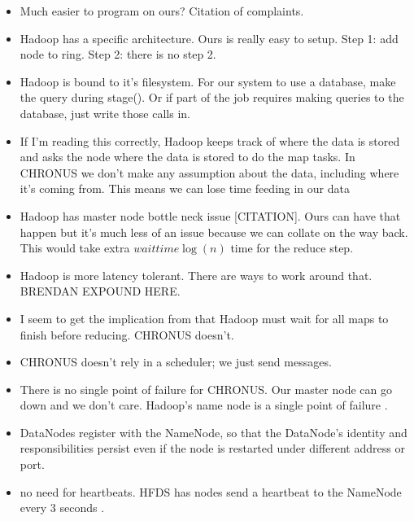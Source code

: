 \documentclass[conference, compsocconf, letterpaper]{IEEEtran}
\begin{document}
\begin{itemize}
    \item Much easier to program on ours? Citation of complaints.

    \item Hadoop has a specific architecture.  Ours is really easy to setup.  Step 1: add node to ring. Step 2: there is no step 2.

    \item Hadoop is bound to it's filesystem. For our system to use a database, make the query during stage().  Or if part of the job requires making queries to the database, just write those calls in.
    
    
    \item If I'm reading this correctly, Hadoop keeps track of where the data is stored and asks the node where the data is stored to do the map tasks.  In CHRONUS we don't make any assumption about the data, including where it's coming from.  This means we can lose time feeding in our data


    \item Hadoop has master node bottle neck issue [CITATION].  Ours can have that happen but it's much less of an issue because we can collate on the way back.   This would take extra  $waittime \log(n)$ time for the reduce step. 

    \item Hadoop is more latency tolerant.  There are ways to work around that.  BRENDAN EXPOUND HERE.

    \item I seem to get the implication from \cite{mrsurvey} that Hadoop must wait for all maps to finish before reducing.  CHRONUS doesn't.
    \item CHRONUS doesn't rely in a scheduler; we just send messages.  

    \item There is no single point of failure for CHRONUS.  Our master node can go down and we don't care. Hadoop's name node is a single point of failure \cite{shvachko2010hadoop}.
    \item DataNodes register with the NameNode, so that the DataNode's identity and responsibilities persist even if the node is restarted under different address or port.
    
    \item no need for heartbeats.  HFDS has nodes send a heartbeat to the NameNode every 3 seconds \cite{shvachko2010hadoop}.  
\end{itemize}
\end{document}
